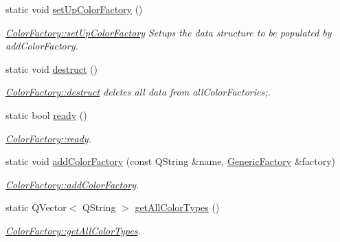 \begin{DoxyCompactItemize}
\item 
\mbox{\label{class_color_factory_ad47298cad09cd5d2eb52c801354f5c8e}} 
static void \hyperlink{class_color_factory_ad47298cad09cd5d2eb52c801354f5c8e}{set\+Up\+Color\+Factory} ()
\begin{DoxyCompactList}\small\item\em \hyperlink{class_color_factory_ad47298cad09cd5d2eb52c801354f5c8e}{Color\+Factory\+::set\+Up\+Color\+Factory} Setups the data structure to be populated by add\+Color\+Factory. \end{DoxyCompactList}\item 
\mbox{\label{class_color_factory_a99c58dc4bb1d431f1a7c399fec9d2486}} 
static void \hyperlink{class_color_factory_a99c58dc4bb1d431f1a7c399fec9d2486}{destruct} ()
\begin{DoxyCompactList}\small\item\em \hyperlink{class_color_factory_a99c58dc4bb1d431f1a7c399fec9d2486}{Color\+Factory\+::destruct} deletes all data from all\+Color\+Factories;. \end{DoxyCompactList}\item 
static bool \hyperlink{class_color_factory_a998d381b54b7b74ca24a99593030a452}{ready} ()
\begin{DoxyCompactList}\small\item\em \hyperlink{class_color_factory_a998d381b54b7b74ca24a99593030a452}{Color\+Factory\+::ready}. \end{DoxyCompactList}\item 
static void \hyperlink{class_color_factory_a16fd150054d514e72eaf6d5bf9e80fe2}{add\+Color\+Factory} (const Q\+String \&name, \hyperlink{class_generic_factory}{Generic\+Factory} \&factory)
\begin{DoxyCompactList}\small\item\em \hyperlink{class_color_factory_a16fd150054d514e72eaf6d5bf9e80fe2}{Color\+Factory\+::add\+Color\+Factory}. \end{DoxyCompactList}\item 
static Q\+Vector$<$ Q\+String $>$ \hyperlink{class_color_factory_a47dab64f01e0d5543ed41d82742b1a32}{get\+All\+Color\+Types} ()
\begin{DoxyCompactList}\small\item\em \hyperlink{class_color_factory_a47dab64f01e0d5543ed41d82742b1a32}{Color\+Factory\+::get\+All\+Color\+Types}. \end{DoxyCompactList}\item 

\end{DoxyCompactItemize}
